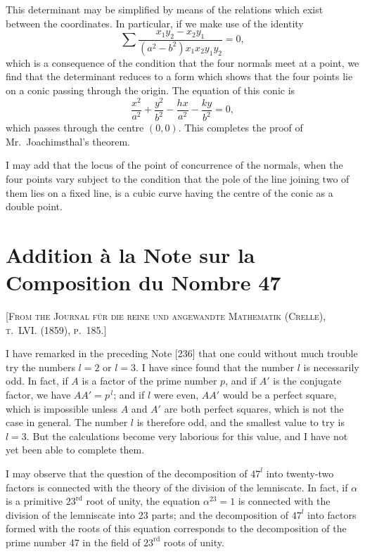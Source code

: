 \documentclass[11pt,a4paper]{article}
\begin{document}
\setcounter{page}{78}

This determinant may be simplified by means of the relations which exist between the coordinates. In particular, if we make use of the identity
\[
\sum \frac{x_1y_2 - x_2y_1}{(a^2-b^2)x_1x_2y_1y_2} = 0,
\]
which is a consequence of the condition that the four normals meet at a point, we find that the determinant reduces to a form which shows that the four points lie on a conic passing through the origin. The equation of this conic is
\[
\frac{x^2}{a^2} + \frac{y^2}{b^2} - \frac{hx}{a^2} - \frac{ky}{b^2} = 0,
\]
which passes through the centre $(0,0)$. This completes the proof of Mr.~Joachimsthal's theorem.

I may add that the locus of the point of concurrence of the normals, when the four points vary subject to the condition that the pole of the line joining two of them lies on a fixed line, is a cubic curve having the centre of the conic as a double point.

\newpage



\section{Addition à la Note sur la Composition du Nombre 47}

\textsc{[From the Journal für die reine und angewandte Mathematik (Crelle), t.~LVI. (1859), p.~185.]}
\label{paper:239}

\setcounter{page}{79}

I have remarked in the preceding Note [236] that one could without much trouble try the numbers $l=2$ or $l=3$. I have since found that the number $l$ is necessarily odd. In fact, if $A$ is a factor of the prime number $p$, and if $A'$ is the conjugate factor, we have $AA'=p^{\,l}$; and if $l$ were even, $AA'$ would be a perfect square, which is impossible unless $A$ and $A'$ are both perfect squares, which is not the case in general. The number $l$ is therefore odd, and the smallest value to try is $l=3$. But the calculations become very laborious for this value, and I have not yet been able to complete them.

\setcounter{page}{80}

I may observe that the question of the decomposition of $47^l$ into twenty-two factors is connected with the theory of the division of the lemniscate. In fact, if $\alpha$ is a primitive $23^{\text{rd}}$ root of unity, the equation $\alpha^{23}=1$ is connected with the division of the lemniscate into 23 parts; and the decomposition of $47^l$ into factors formed with the roots of this equation corresponds to the decomposition of the prime number 47 in the field of $23^{\text{rd}}$ roots of unity.
\end{document}
